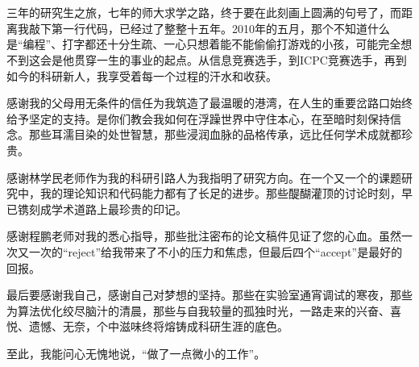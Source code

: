 { 
  \chapter*{\LARGE{}}

  

三年的研究生之旅，七年的师大求学之路，终于要在此刻画上圆满的句号了，而距离我敲下第一行代码，已经过了整整十五年。2010年的五月，那个不知道什么是“编程”、打字都还十分生疏、一心只想着能不能偷偷打游戏的小孩，可能完全想不到这会是他贯穿一生的事业的起点。从信息竞赛选手，到ICPC竞赛选手，再到如今的科研新人，我享受着每一个过程的汗水和收获。

感谢我的父母用无条件的信任为我筑造了最温暖的港湾，在人生的重要岔路口始终给予坚定的支持。是你们教会我如何在浮躁世界中守住本心，在至暗时刻保持信念。那些耳濡目染的处世智慧，那些浸润血脉的品格传承，远比任何学术成就都珍贵。

感谢林学民老师作为我的科研引路人为我指明了研究方向。在一个又一个的课题研究中，我的理论知识和代码能力都有了长足的进步。那些醍醐灌顶的讨论时刻，早已镌刻成学术道路上最珍贵的印记。

感谢程鹏老师对我的悉心指导，那些批注密布的论文稿件见证了您的心血。虽然一次又一次的“reject”给我带来了不小的压力和焦虑，但最后四个“accept”是最好的回报。


最后要感谢我自己，感谢自己对梦想的坚持。那些在实验室通宵调试的寒夜，那些为算法优化绞尽脑汁的清晨，那些与自我较量的孤独时光，一路走来的兴奋、喜悦、遗憾、无奈，个中滋味终将熔铸成科研生涯的底色。

至此，我能问心无愧地说，“做了一点微小的工作”。



  \hspace{8cm}
}